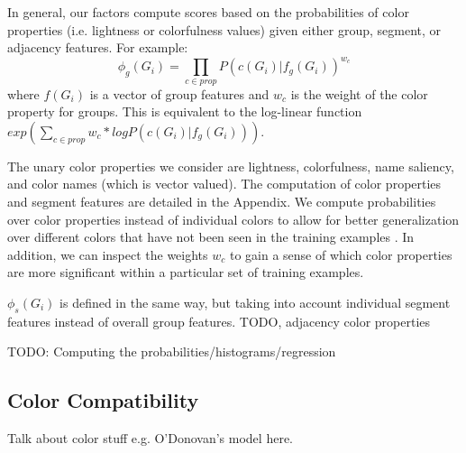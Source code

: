 In general, our factors compute scores based on the probabilities of color properties (i.e. lightness or colorfulness values) given either group, segment, or adjacency features. For example: 
\begin{equation}
\phi_g(G_i) = \prod_{c \in prop}P(c(G_i)|f_g(G_i))^{w_c}
\end{equation}
where $f(G_i)$ is a vector of group features and $w_c$ is the weight of the color property for groups. This is equivalent to the log-linear function $exp\left(\sum_{c \in prop} w_c * logP(c(G_i)|f_g(G_i))\right)$.

The unary color properties we consider are lightness, colorfulness, name saliency, and color names (which is vector valued). The computation of color properties and segment features are detailed in the Appendix.
We compute probabilities over color properties instead of individual colors to allow for better generalization over different colors that have not been seen in the training examples . In addition, we can inspect the weights $w_c$ to gain a sense of which color properties are more significant within a particular set of training examples.

$\phi_s(G_i)$ is defined in the same way, but taking into account individual segment features instead of overall group features.
TODO, adjacency color properties


TODO: Computing the probabilities/histograms/regression



\subsection{Color Compatibility}
\label{sec:colorCompat}
Talk about color stuff e.g. O'Donovan's model here.